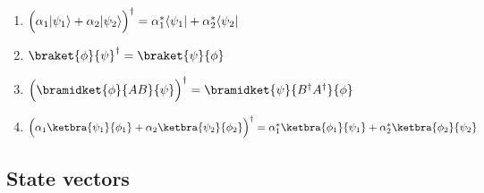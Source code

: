 \documentclass[10pt]{article}
\DeclarePairedDelimiter\bra{\langle}{\rvert}
\DeclarePairedDelimiter\ket{\lvert}{\rangle}
\begin{document}
                \begin{enumerate}
                    \item $\Big(\alpha_1\ket{\psi_1}+\alpha_2\ket{\psi_2}\Big)^\dagger = \alpha_1^*\bra{\psi_1}+\alpha_2^*\bra{\psi_2}$
                    \item $\braket{\phi}{\psi}^\dagger = \braket{\psi}{\phi}$
                    \item $\Big(\bramidket{\phi}{AB}{\psi}\Big)^\dagger = \bramidket{\psi}{B^\dagger A^\dagger}{\phi}$
                    \item $\Big(\alpha_1\ketbra{\psi_1}{\phi_1}+\alpha_2\ketbra{\psi_2}{\phi_2}\Big)^\dagger = \alpha_1^*\ketbra{\phi_1}{\psi_1}+\alpha_2^*\ketbra{\phi_2}{\psi_2}$
                \end{enumerate}

        \subsection{State vectors}
\end{document}
